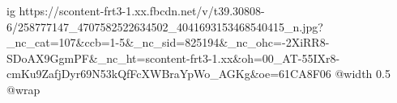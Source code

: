  
 
 
 
 

\ifcmt
  ig https://scontent-frt3-1.xx.fbcdn.net/v/t39.30808-6/258777147_4707582522634502_4041693153468540415_n.jpg?_nc_cat=107&ccb=1-5&_nc_sid=825194&_nc_ohc=-2XiRR8-SDoAX9GgmPF&_nc_ht=scontent-frt3-1.xx&oh=00_AT-55IXr8-cmKu9ZafjDyr69N53kQfFcXWBraYpWo_AGKg&oe=61CA8F06
  @width 0.5
  @wrap 
\fi
